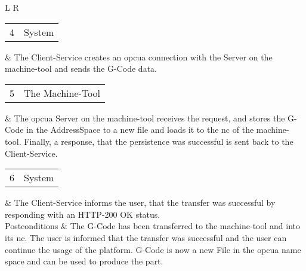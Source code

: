 \documentclass[
a4paper,
twoside,
headsepline,
cleardoublepage=empty,
parskip=half,
draft=false
]{scrbook}
\begin{document}
\begin{table}[hbtp]
\begin{tabular}{L R}
						\\ \midrule
						\begin{tabular}{c c} 4 & System \end{tabular} & The Client-Service creates an \gls{opcua} connection with the Server on the machine-tool and sends the G-Code data.
						\\ \midrule
						\begin{tabular}{c c} 5 & The Machine-Tool \end{tabular} & The \gls{opcua} Server on the machine-tool receives the request, and stores the G-Code in the AddressSpace to a new file and loads it to the \gls{nc} of the machine-tool. Finally, a response, that the persistence was successful is sent back to the Client-Service.
						\\ \midrule
						\begin{tabular}{c c} 6 & System \end{tabular} & The Client-Service informs the user, that the transfer was successful by responding with an HTTP-200 OK status.
						\\ \midrule
						Postconditions & The G-Code has been transferred to the machine-tool and into its \gls{nc}. The user is informed that the transfer was successful and the user can continue the usage of the platform. G-Code is now a new File in the \gls{opcua} name space and can be used to produce the part.
						\\ \bottomrule
					\end{tabular}
				\end{table}
\end{document}
